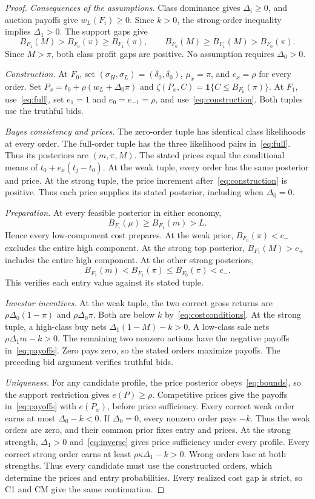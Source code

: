 \documentclass[12pt]{article}
\newcommand{\ind}{\mathbf 1}
\begin{document}
\begin{proof}
\emph{Consequences of the assumptions.}
Class dominance gives $\Delta_i\ge0$, and auction payoffs give $w_L(F_i)\ge0$.
Since $k>0$, the strong-order inequality implies $\Delta_1>0$.
The support gaps give
\[
 B_{F_1}(M)>B_{F_0}(\pi)\ge B_{F_1}(\pi),\qquad
 B_{F_0}(M)\ge B_{F_1}(M)>B_{F_0}(\pi).
\]
Since $M>\pi$, both class profit gaps are positive.
No assumption requires $\Delta_0>0$.

\emph{Construction.}
At $F_0$, set $(\sigma_H,\sigma_L)=(\delta_0,\delta_0)$, $\mu_x=\pi$, and $e_x=\rho$ for every order.
Set $P_x=t_0+\rho(w_L+\Delta_0\pi)$ and $\zeta(P_x,C)=\ind\{C\le B_{F_0}(\pi)\}$.
At $F_1$, use~\eqref{eq:full}, set $e_1=1$ and $e_0=e_{-1}=\rho$, and use~\eqref{eq:construction}.
Both tuples use the truthful bids.

\emph{Bayes consistency and prices.}
The zero-order tuple has identical class likelihoods at every order.
The full-order tuple has the three likelihood pairs in~\eqref{eq:full}.
Thus its posteriors are $(m,\pi,M)$.
The stated prices equal the conditional means of $t_0+e_x(t_j-t_0)$.
At the weak tuple, every order has the same posterior and price.
At the strong tuple, the price increment after~\eqref{eq:construction} is positive.
Thus each price supplies its stated posterior, including when $\Delta_0=0$.

\emph{Preparation.}
At every feasible posterior in either economy,
\[
 B_{F_i}(\mu)\ge B_{F_1}(m)>L.
\]
Hence every low-component cost prepares.
At the weak prior, $B_{F_0}(\pi)<c_-$ excludes the entire high component.
At the strong top posterior, $B_{F_1}(M)>c_+$ includes the entire high component.
At the other strong posteriors,
\[
 B_{F_1}(m)<B_{F_1}(\pi)\le B_{F_0}(\pi)<c_-.
\]
This verifies each entry value against its stated tuple.

\emph{Investor incentives.}
At the weak tuple, the two correct gross returns are $\rho\Delta_0(1-\pi)$ and $\rho\Delta_0\pi$.
Both are below $k$ by~\eqref{eq:costconditions}.
At the strong tuple, a high-class buy nets $\Delta_1(1-M)-k>0$.
A low-class sale nets $\rho\Delta_1m-k>0$.
The remaining two nonzero actions have the negative payoffs in~\eqref{eq:payoffs}.
Zero pays zero, so the stated orders maximize payoffs.
The preceding bid argument verifies truthful bids.

\emph{Uniqueness.}
For any candidate profile, the price posterior obeys~\eqref{eq:bounds}, so the support restriction gives $e(P)\ge\rho$.
Competitive prices give the payoffs in~\eqref{eq:payoffs} with $e(P_x)$, before price sufficiency.
Every correct weak order earns at most $\Delta_0-k<0$.
If $\Delta_0=0$, every nonzero order pays $-k$.
Thus the weak orders are zero, and their common prior fixes entry and prices.
At the strong strength, $\Delta_1>0$ and~\eqref{eq:inverse} gives price sufficiency under every profile.
Every correct strong order earns at least $\rho\kappa\Delta_1-k>0$.
Wrong orders lose at both strengths.
Thus every candidate must use the constructed orders, which determine the prices and entry probabilities.
Every realized cost gap is strict, so C1 and CM give the same continuation.


\end{proof}
\end{document}
